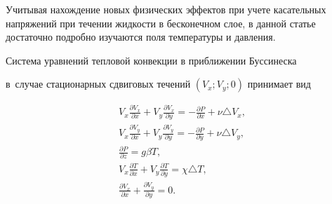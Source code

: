 Учитывая нахождение новых физических эффектов при учете касательных напряжений при течении жидкости в бесконечном слое, в данной статье достаточно подробно изучаются поля температуры и давления.



\smallskip




Система уравнений тепловой конвекции в приближении Буссинеска \cite{Gershuni1989}

в~случае стационарных сдвиговых течений $\left(V_x; V_y; 0\right)$  принимает вид

\begin{gather}%

\displaystyle

V_x\frac{\partial V_x}{\partial x}+V_y\frac{\partial V_x}{\partial y}=-\frac{\partial P}{\partial x} +\nu\triangle V_x,\\



\displaystyle

V_x\frac{\partial V_y}{\partial x}+V_y\frac{\partial V_y}{\partial y}=-\frac{\partial P}{\partial y} +\nu\triangle V_y,\\



\label{eq:ur-conv}

\frac{\partial P}{\partial z}=g\beta T,\\



\displaystyle

V_x\frac{\partial T}{\partial x}+V_y\frac{\partial T}{\partial y}=\chi\triangle T,\\



\displaystyle

\frac{\partial V_x}{\partial x}+\frac{\partial V_y}{\partial y}=0.

\end{gather}

